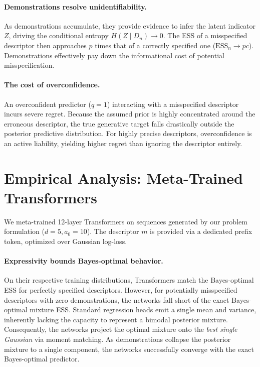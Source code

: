 \documentclass{article}
\begin{document}
\paragraph{Demonstrations resolve unidentifiability.} As demonstrations accumulate, they provide evidence to infer the latent indicator $Z$, driving the conditional entropy $H(Z \mid D_n) \to 0$. The ESS of a misspecified descriptor then approaches $p$ times that of a correctly specified one ($\text{ESS}_n \to p c$). Demonstrations effectively pay down the informational cost of potential misspecification.

\paragraph{The cost of overconfidence.} An overconfident predictor ($q=1$) interacting with a misspecified descriptor incurs severe regret. Because the assumed prior is highly concentrated around the erroneous descriptor, the true generative target falls drastically outside the posterior predictive distribution. For highly precise descriptors, overconfidence is an active liability, yielding higher regret than ignoring the descriptor entirely. 

\section{Empirical Analysis: Meta-Trained Transformers}
We meta-trained 12-layer Transformers on sequences generated by our problem formulation ($d=5, a_0=10$). The descriptor $m$ is provided via a dedicated prefix token, optimized over Gaussian log-loss.

\paragraph{Expressivity bounds Bayes-optimal behavior.} On their respective training distributions, Transformers match the Bayes-optimal ESS for perfectly specified descriptors. However, for potentially misspecified descriptors with zero demonstrations, the networks fall short of the exact Bayes-optimal mixture ESS. Standard regression heads emit a single mean and variance, inherently lacking the capacity to represent a bimodal posterior mixture. Consequently, the networks project the optimal mixture onto the \emph{best single Gaussian} via moment matching. As demonstrations collapse the posterior mixture to a single component, the networks successfully converge with the exact Bayes-optimal predictor.
\end{document}
